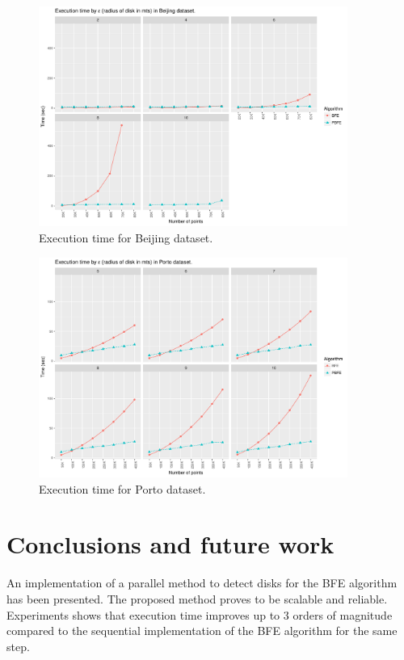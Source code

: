 \documentclass[12pt]{scrartcl}
\begin{document}
\begin{figure}
 \centering
 \includegraphics[width=0.9\textwidth]{figures/mbeijing} 
 \caption{Execution time for Beijing dataset.}
 \label{fig:mbeijing}
\end{figure}

\begin{figure}
 \centering
 \includegraphics[width=0.9\textwidth]{figures/mporto} 
 \caption{Execution time for Porto dataset.}
 \label{fig:mporto}
\end{figure}

\section{Conclusions and future work}\label{sec:conclusions}

An implementation of a parallel method to detect disks for the BFE algorithm has been presented.  The proposed method proves to be scalable and reliable. Experiments shows that execution time improves up to 3 orders of magnitude compared to the sequential implementation of the BFE algorithm for the same step.
\end{document}
